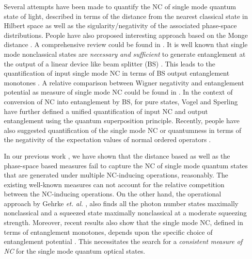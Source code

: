 \documentclass[letter,scriptaddress,twocolumn,prl,showkeys]{revtex4}
\begin{document}
Several attempts have been made to quantify the NC of single mode quantum state of light, described in terms of the distance from the nearest classical state in Hilbert space \cite{ncm_trn_hillery, ncm_hsd_dodonov} as well as the sigularity/negativity \cite{ncm_depth_lee, ncm_depth_crit_barnett, ncm_nwf_kenfack} of the associated phase-space distributions. 
People have also proposed interesting approach based on the Monge distance \cite{ncm_md_zyczk}. 
A comprehensive review could be found in \cite{nc_rev_1, nc_rev_2}.
It is well known that single mode nonclassical states are {\em necessary and sufficient} to generate entanglement at the output of a linear device like beam splitter (BS) \cite{nc_bsent_nec, nc_bsent_suff_ivan}. 
This leads to the quantification of input single mode NC in terms of BS output entanglement monotones \cite{ncm_ln_asboth}. 
A relative comparison between Wigner negativity and entanglement potential as measure of single mode NC could be found in \cite{ncm_nwf_ln_compare_li}. 
In the context of conversion of NC into entanglement by BS, for pure states, Vogel and Sperling \cite{nc_bsent_qsp_vogel} have further defined a unified quantification of input NC and output entanglement using the quantum superposition principle.
Recently, people have also suggested quantification of the single mode NC or quantumness in terms of the negativity of the expectation values of normal ordered operators \cite{ncm_noo_gehrke, ncm_noo_nori}.

In our previous work \cite{nc_bsent_bose_kumar}, we have shown that the distance based \cite{ncm_hsd_dodonov} as well as the phase-space based \cite{ncm_depth_lee, ncm_nwf_kenfack} measures fail to capture the NC of single mode quantum states that are generated under multiple NC-inducing operations, reasonably. 
The existing well-known measures \cite{ncm_hsd_dodonov, ncm_depth_lee, ncm_nwf_kenfack} can not account for the relative competition between the NC-inducing operations. 
On the other hand, the operational approach by Gehrke {\em et. al.} \cite{ncm_noo_gehrke}, also finds all the photon number states maximally nonclassical and a squeezed state maximally nonclassical at a moderate squeezing strength. 
Moreover, recent results also show that the single mode NC, defined in terms of entanglement monotones, depends upon the specific choice of entanglement potential \cite{ncm_ep_crit_nori}. This necessitates the search for a {\em consistent measure of NC} for the single mode quantum optical states.
\end{document}
